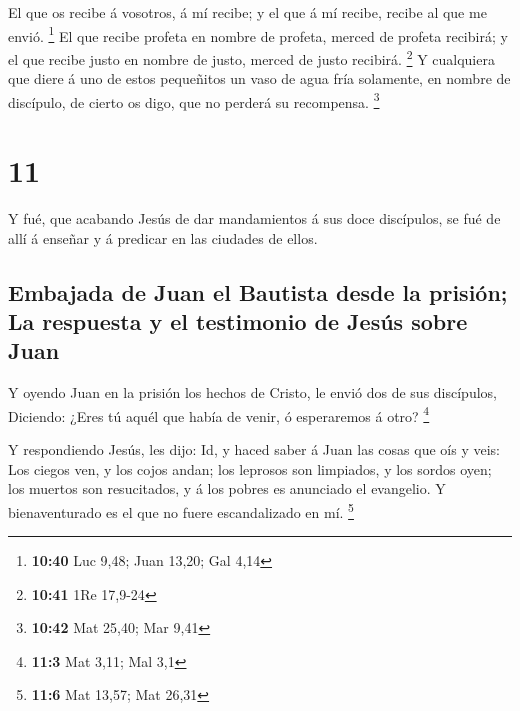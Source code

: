  El que os recibe á vosotros, á mí recibe; y el que á mí
recibe, recibe al que me envió. \footnote{\textbf{10:40} Luc 9,48; Juan
  13,20; Gal 4,14}  El que recibe profeta en nombre de
profeta, merced de profeta recibirá; y el que recibe justo en nombre de
justo, merced de justo recibirá. \footnote{\textbf{10:41} 1Re 17,9-24}
 Y cualquiera que diere á uno de estos pequeñitos un vaso
de agua fría solamente, en nombre de discípulo, de cierto os digo, que
no perderá su recompensa. \footnote{\textbf{10:42} Mat 25,40; Mar 9,41}

\hypertarget{section-10}{%
\section{11}\label{section-10}}

 Y fué, que acabando Jesús de dar mandamientos á sus doce
discípulos, se fué de allí á enseñar y á predicar en las ciudades de
ellos.

\hypertarget{embajada-de-juan-el-bautista-desde-la-prisiuxf3n-la-respuesta-y-el-testimonio-de-jesuxfas-sobre-juan}{%
\subsection{Embajada de Juan el Bautista desde la prisión; La respuesta
y el testimonio de Jesús sobre
Juan}\label{embajada-de-juan-el-bautista-desde-la-prisiuxf3n-la-respuesta-y-el-testimonio-de-jesuxfas-sobre-juan}}

 Y oyendo Juan en la prisión los hechos de Cristo, le envió
dos de sus discípulos,  Diciendo: ¿Eres tú aquél que había
de venir, ó esperaremos á otro? \footnote{\textbf{11:3} Mat 3,11; Mal
  3,1}

 Y respondiendo Jesús, les dijo: Id, y haced saber á Juan
las cosas que oís y veis:  Los ciegos ven, y los cojos
andan; los leprosos son limpiados, y los sordos oyen; los muertos son
resucitados, y á los pobres es anunciado el evangelio.  Y
bienaventurado es el que no fuere escandalizado en mí. \footnote{\textbf{11:6}
  Mat 13,57; Mat 26,31}

